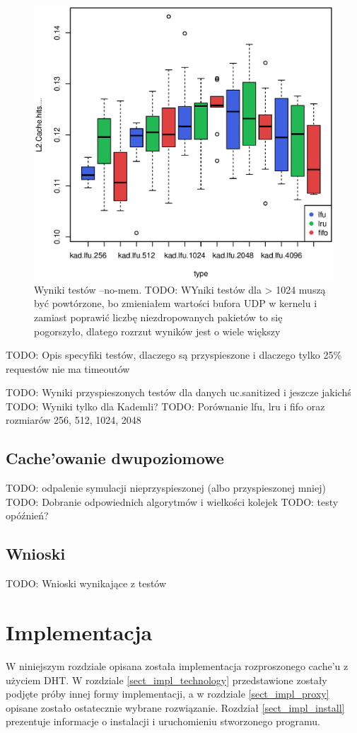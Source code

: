 \documentclass[a4paper,11pt]{scrartcl}
\newcommand{\s}{ }
\newcommand{\keszu}{cache'u}
\newcommand{\Keszowanie}{Cache'owanie}
\begin{document}
\begin{figure}[h!]
\includegraphics[width=0.95\linewidth]{img/cache.eps}
\caption{Wyniki testów --no-mem. TODO: WYniki testów dla > 1024 muszą być powtórzone, bo zmieniałem wartości bufora UDP w kernelu i zamiast poprawić liczbę niezdropowanych pakietów to się pogorszyło, dlatego rozrzut wyników jest o wiele większy}
\end{figure}

TODO: Opis specyfiki testów, dlaczego są przyspieszone i dlaczego tylko 25\% requestów nie ma timeoutów

TODO: Wyniki przyspieszonych testów dla danych uc.sanitized i jeszcze jakichś
TODO: Wyniki tylko dla Kademli?
TODO: Porównanie lfu, lru i fifo oraz rozmiarów 256, 512, 1024, 2048


\subsection{\Keszowanie\s dwupoziomowe}
TODO: odpalenie symulacji nieprzyspieszonej (albo przyspieszonej mniej)
TODO: Dobranie odpowiednich algorytmów i wielkości kolejek
TODO: testy opóźnień?

\subsection{Wnioski}
TODO: Wnioski wynikające z testów

\section{Implementacja}
W niniejszym rozdziale opisana została implementacja rozproszonego \keszu\s z użyciem DHT. W rozdziale \ref{sect_impl_technology}
przedstawione zostały podjęte próby innej formy implementacji, a w rozdziale \ref{sect_impl_proxy} opisane zostało ostatecznie wybrane rozwiązanie.
Rozdział \ref{sect_impl_install} prezentuje informacje o instalacji i uruchomieniu stworzonego programu.
\end{document}

